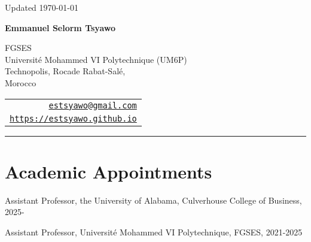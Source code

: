 \documentclass[12pt,letterpaper]{article}
\def\name{Emmanuel Selorm Tsyawo}
\renewenvironment{itemize}{
  \begin{list}{}{
    \setlength{\leftmargin}{1.5em}
  }
}{
  \end{list}
}
\begin{document}
\begin{minipage}{\linewidth}
  \begin{flushright}
    Updated \today
  \end{flushright}
\end{minipage}

\vspace{10pt}


\centerline{\huge \bf \name}

\vspace{0.25in}

\begin{minipage}{0.65\linewidth}
	FGSES\\
	Université Mohammed VI Polytechnique (UM6P)\\
  Technopolis, Rocade Rabat-Salé,\\
	Morocco \\
\end{minipage}
\begin{minipage}{0.5\linewidth}
  \begin{tabular}{r}
    \href{mailto:estsyawo@gmail.com}{\tt estsyawo@gmail.com} \\
    \href{https://estsyawo.github.io}{\tt https://estsyawo.github.io} \\
    
  \end{tabular}
\end{minipage}

\vspace{10pt}
\rule{\linewidth}{0.4pt}


\section*{Academic Appointments}
\begin{itemize}
  \item Assistant Professor, the University of Alabama, Culverhouse College of Business, 2025-
  \item Assistant Professor, Universit\'e Mohammed VI Polytechnique, FGSES, 2021-2025
\end{itemize}
\end{document}
